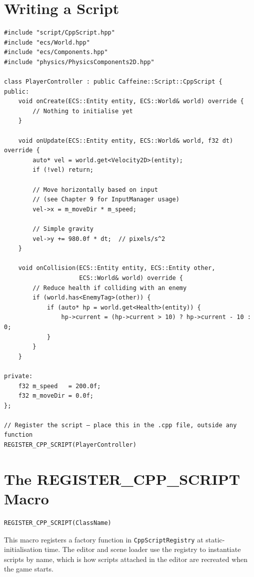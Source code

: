 \section{Writing a Script}

\begin{lstlisting}
#include "script/CppScript.hpp"
#include "ecs/World.hpp"
#include "ecs/Components.hpp"
#include "physics/PhysicsComponents2D.hpp"

class PlayerController : public Caffeine::Script::CppScript {
public:
    void onCreate(ECS::Entity entity, ECS::World& world) override {
        // Nothing to initialise yet
    }

    void onUpdate(ECS::Entity entity, ECS::World& world, f32 dt) override {
        auto* vel = world.get<Velocity2D>(entity);
        if (!vel) return;

        // Move horizontally based on input
        // (see Chapter 9 for InputManager usage)
        vel->x = m_moveDir * m_speed;

        // Simple gravity
        vel->y += 980.0f * dt;  // pixels/s^2
    }

    void onCollision(ECS::Entity entity, ECS::Entity other,
                     ECS::World& world) override {
        // Reduce health if colliding with an enemy
        if (world.has<EnemyTag>(other)) {
            if (auto* hp = world.get<Health>(entity)) {
                hp->current = (hp->current > 10) ? hp->current - 10 : 0;
            }
        }
    }

private:
    f32 m_speed   = 200.0f;
    f32 m_moveDir = 0.0f;
};

// Register the script — place this in the .cpp file, outside any function
REGISTER_CPP_SCRIPT(PlayerController)
\end{lstlisting}

\section{The REGISTER\_CPP\_SCRIPT Macro}

\begin{lstlisting}
REGISTER_CPP_SCRIPT(ClassName)
\end{lstlisting}

This macro registers a factory function in \texttt{CppScriptRegistry} at
static-initialisation time. The editor and scene loader use the registry to
instantiate scripts by name, which is how scripts attached in the editor are
recreated when the game starts.

